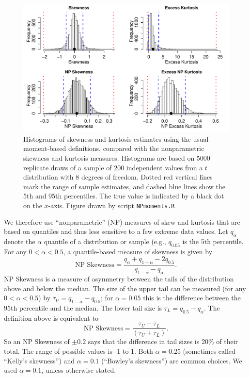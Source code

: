 \documentclass[11pt]{article}
\newcounter{box}
\newcommand{\be}{\begin{equation}}
\newcommand{\ee}{\end{equation}}
\begin{document}
{\begin{figure}[tbp]
\centering
\includegraphics[width=\textwidth]{figures/NPmoments.pdf}
\caption{Histograms of skewness and kurtosis estimates using the usual moment-based definitions, compared with the nonparametric
skewness and kurtosis measures. Histograms are based on 5000 replicate draws of a sample of 200 independent values fron 
a $t$ distribution with 8 degrees of freedom. Dotted red vertical lines mark the range of sample estimates, 
and dashed blue lines show the 5th and 95th percentiles. The true value is indicated by a black dot on the $x$-axis.
Figure drawn by script \texttt{NPmoments.R}}
\label{fig:NPmoments}
\end{figure} 

We therefore use ``nonparametric'' (NP) measures of skew and kurtosis that are based on quantiles and thus  
less sensitive to a few extreme data values. Let $q_\alpha$ denote the $\alpha$ quantile of a distribution or sample (e.g., $q_{0.05}$ 
is the 5th percentile. For any $0 < \alpha < 0.5$, a quantile-based measure of skewness is given by \citep{mcgillivray-1986}
\be
\mbox{NP Skewness} = \frac{q_\alpha + q_{1-\alpha} - 2 q_{0.5}}{q_{1-\alpha} - q_\alpha}.
\ee
NP Skewness is a measure of asymmetry between the tails of the distribution above and below the median. The size of the upper
tail can be measured (for any $0 < \alpha < 0.5$) by $\tau_U = q_{1-\alpha} - q_{0.5}$; for $\alpha=0.05$ this is the difference
between the 95th percentile and the median. The lower tail size is $\tau_L = q_{0.5} - q_\alpha$. The definition above
is equivalent to  
\be
\mbox{NP Skewness} = \frac{\tau_U - \tau_L}{(\tau_U + \tau_L)}.
\label{eqn:NPskew}
\ee
So an NP Skewness of $\pm 0.2$ says that the difference in tail sizes is 20\% of their total. The range of possible values 
is -1 to 1. Both $\alpha=0.25$ (sometimes called ``Kelly's skewness'') and $\alpha=0.1$ (``Bowley's skewness'') 
are common choices. We used $\alpha=0.1$, unless otherwise stated.  
 
}
\end{document}
